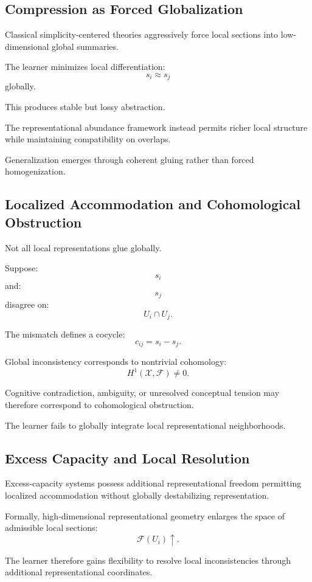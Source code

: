 \documentclass[12pt,a4paper]{article}
\begin{document}
\subsection{Compression as Forced Globalization}

Classical simplicity-centered theories aggressively force local sections into low-dimensional global summaries.

The learner minimizes local differentiation:
\[
s_i
\approx
s_j
\]
globally.

This produces stable but lossy abstraction.

The representational abundance framework instead permits richer local structure while maintaining compatibility on overlaps.

Generalization emerges through coherent gluing rather than forced homogenization.

\subsection{Localized Accommodation and Cohomological Obstruction}

Not all local representations glue globally.

Suppose:
\[
s_i
\]
and:
\[
s_j
\]
disagree on:
\[
U_i\cap U_j.
\]

The mismatch defines a cocycle:
\[
c_{ij}
=
s_i-s_j.
\]

Global inconsistency corresponds to nontrivial cohomology:
\[
H^1(\mathcal{X},\mathcal{F})
\neq
0.
\]

Cognitive contradiction, ambiguity, or unresolved conceptual tension may therefore correspond to cohomological obstruction.

The learner fails to globally integrate local representational neighborhoods.

\subsection{Excess Capacity and Local Resolution}

Excess-capacity systems possess additional representational freedom permitting localized accommodation without globally destabilizing representation.

Formally, high-dimensional representational geometry enlarges the space of admissible local sections:
\[
\mathcal{F}(U_i)
\uparrow.
\]

The learner therefore gains flexibility to resolve local inconsistencies through additional representational coordinates.
\end{document}
